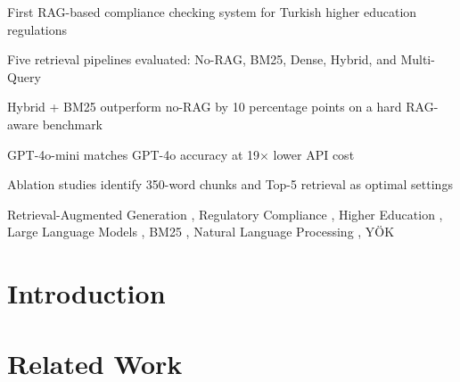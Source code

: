 \documentclass[a4paper,fleqn]{cas-dc}
\begin{document}

\begin{highlights}
\item First RAG-based compliance checking system for Turkish higher education regulations
\item Five retrieval pipelines evaluated: No-RAG, BM25, Dense, Hybrid, and Multi-Query
\item Hybrid + BM25 outperform no-RAG by 10 percentage points on a hard RAG-aware benchmark
\item GPT-4o-mini matches GPT-4o accuracy at 19$\times$ lower API cost
\item Ablation studies identify 350-word chunks and Top-5 retrieval as optimal settings
\end{highlights}

\begin{keywords}
Retrieval-Augmented Generation \sep
Regulatory Compliance \sep
Higher Education \sep
Large Language Models \sep
BM25 \sep
Natural Language Processing \sep
YÖK
\end{keywords}

\maketitle

\section{Introduction}
\label{sec:intro}


\section{Related Work}
\label{sec:related}

\end{document}
